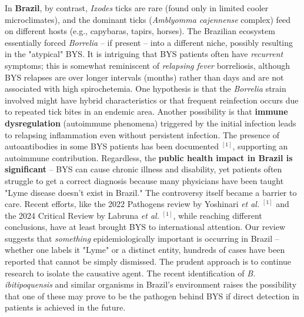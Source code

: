 \documentclass[11pt,letterpaper]{article}
\newcommand{\mycite}[1]{$^{[#1]}$}
\begin{document}
In \textbf{Brazil}, by contrast, \textit{Ixodes} ticks are rare (found only in limited cooler microclimates), and the dominant ticks (\textit{Amblyomma cajennense} complex) feed on different hosts (e.g., capybaras, tapirs, horses). The Brazilian ecosystem essentially forced \textit{Borrelia} – if present – into a different niche, possibly resulting in the "atypical" BYS. It is intriguing that BYS patients often have \textit{recurrent} symptoms; this is somewhat reminiscent of \textit{relapsing fever} borreliosis, although BYS relapses are over longer intervals (months) rather than days and are not associated with high spirochetemia. One hypothesis is that the \textit{Borrelia} strain involved might have hybrid characteristics or that frequent reinfection occurs due to repeated tick bites in an endemic area. Another possibility is that \textbf{immune dysregulation} (autoimmune phenomena) triggered by the initial infection leads to relapsing inflammation even without persistent infection. The presence of autoantibodies in some BYS patients has been documented \mycite{1}, supporting an autoimmune contribution. Regardless, the \textbf{public health impact in Brazil is significant} – BYS can cause chronic illness and disability, yet patients often struggle to get a correct diagnosis because many physicians have been taught "Lyme disease doesn't exist in Brazil." The controversy itself became a barrier to care. Recent efforts, like the 2022 Pathogens review by Yoshinari \textit{et al.} \mycite{1} and the 2024 Critical Review by Labruna \textit{et al.} \mycite{1}, while reaching different conclusions, have at least brought BYS to international attention. Our review suggests that \textit{something} epidemiologically important is occurring in Brazil – whether one labels it "Lyme" or a distinct entity, hundreds of cases have been reported that cannot be simply dismissed. The prudent approach is to continue research to isolate the causative agent. The recent identification of \textit{B. ibitipoquensis} and similar organisms in Brazil's environment raises the possibility that one of these may prove to be the pathogen behind BYS if direct detection in patients is achieved in the future.
\end{document}

